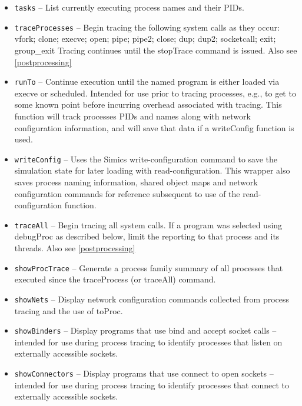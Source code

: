 \documentclass[titlepage]{article}
\begin{document}
\label{commands}
\begin{itemize}
\item {\tt tasks} -- List currently executing process names and their PIDs.
\item {\tt traceProcesses} – Begin tracing the following system calls as they occur:
vfork; clone; execve;  open; pipe; pipe2; close; dup; dup2; socketcall; exit; group\_exit
Tracing continues until the stopTrace command is issued.  Also see \ref{postprocessing}

\item {\tt runTo} – Continue execution until the named program is either loaded via execve or scheduled.  Intended for use prior to tracing processes, e.g., to get to some known point before incurring overhead associated with tracing.   This function will track processes PIDs and names along with network configuration information, and will save that data if a writeConfig function is used.

\item {\tt writeConfig} – Uses the Simics write-configuration command to save the simulation state for later loading with read-configuration.  This wrapper also saves process naming information, shared object maps and network configuration commands for reference subsequent to use of the read-configuration function.

\item {\tt traceAll} – Begin tracing all system calls.  If a program was selected using debugProc as described below, limit the reporting to that process and its threads.  Also see \ref{postprocessing}

\item {\tt showProcTrace} – Generate a process family summary of all processes that executed since the traceProcess (or traceAll) command.

\item {\tt showNets} – Display network configuration commands collected from process tracing and the use of toProc.

\item {\tt showBinders} – Display programs that use bind and accept socket calls – intended for use during process tracing to identify processes that listen on externally accessible sockets.

\item {\tt showConnectors} – Display programs that use connect to open sockets – intended for use during process tracing to identify processes that connect to externally accessible sockets.


\end{itemize}
\end{document}
